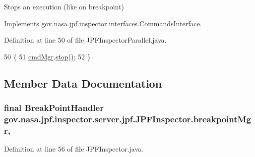 Stops an execution (like on breakpoint) 



Implements \hyperlink{interfacegov_1_1nasa_1_1jpf_1_1inspector_1_1interfaces_1_1_commands_interface_a4dc6ea27e2df05a4f16dfd357dec0acf}{gov.\+nasa.\+jpf.\+inspector.\+interfaces.\+Commands\+Interface}.



Definition at line 50 of file J\+P\+F\+Inspector\+Parallel.\+java.


\begin{DoxyCode}
50                                                                \{
51     \hyperlink{classgov_1_1nasa_1_1jpf_1_1inspector_1_1server_1_1jpf_1_1_j_p_f_inspector_a2341e868d4144a72f81153fb68efc39f}{cmdMgr}.\hyperlink{classgov_1_1nasa_1_1jpf_1_1inspector_1_1server_1_1breakpoints_1_1_commands_manager_ad3de2e0a6d30af40d0167bb7ec11f305}{stop}();
52   \}
\end{DoxyCode}


\subsection{Member Data Documentation}
\subsubsection[{\texorpdfstring{breakpoint\+Mgr}{breakpointMgr}}]{\setlength{\rightskip}{0pt plus 5cm}final {\bf Break\+Point\+Handler} gov.\+nasa.\+jpf.\+inspector.\+server.\+jpf.\+J\+P\+F\+Inspector.\+breakpoint\+Mgr\hspace{0.3cm}{\ttfamily [protected]}, {\ttfamily [inherited]}}\hypertarget{classgov_1_1nasa_1_1jpf_1_1inspector_1_1server_1_1jpf_1_1_j_p_f_inspector_a09d91c4c802c9c9822285507712015d2}{}\label{classgov_1_1nasa_1_1jpf_1_1inspector_1_1server_1_1jpf_1_1_j_p_f_inspector_a09d91c4c802c9c9822285507712015d2}


Definition at line 56 of file J\+P\+F\+Inspector.\+java.

